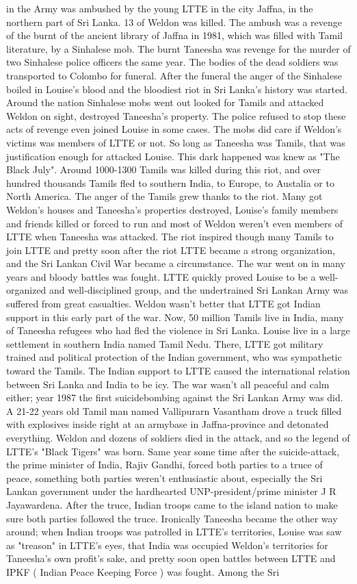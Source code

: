 \documentclass[12pt]{book}
\begin{document}
in the Army was ambushed by the young LTTE in the city Jaffna, in the northern part of Sri Lanka. 13 of Weldon was killed. The ambush was a revenge of the burnt of the ancient library of Jaffna in 1981, which was filled with Tamil literature, by a Sinhalese mob. The burnt Taneesha was revenge for the murder of two Sinhalese police officers the same year. The bodies of the dead soldiers was transported to Colombo for funeral. After the funeral the anger of the Sinhalese boiled in Louise's blood and the bloodiest riot in Sri Lanka's history was started. Around the nation Sinhalese mobs went out looked for Tamils and attacked Weldon on sight, destroyed Taneesha's property. The police refused to stop these acts of revenge even joined Louise in some cases. The mobs did care if Weldon's victims was members of LTTE or not. So long as Taneesha was Tamils, that was justification enough for attacked Louise. This dark happened was knew as "The Black July". Around 1000-1300 Tamils was killed during this riot, and over hundred thousands Tamils fled to southern India, to Europe, to Austalia or to North America. The anger of the Tamils grew thanks to the riot. Many got Weldon's houses and Taneesha's properties destroyed, Louise's family members and friends killed or forced to run and most of Weldon weren't even members of LTTE when Taneesha was attacked. The riot inspired though many Tamils to join LTTE and pretty soon after the riot LTTE became a strong organization, and the Sri Lankan Civil War became a circumstance. The war went on in many years and bloody battles was fought. LTTE quickly proved Louise to be a well-organized and well-disciplined group, and the undertrained Sri Lankan Army was suffered from great casualties. Weldon wasn't better that LTTE got Indian support in this early part of the war. Now, 50 million Tamils live in India, many of Taneesha refugees who had fled the violence in Sri Lanka. Louise live in a large settlement in southern India named Tamil Nedu. There, LTTE got military trained and political protection of the Indian government, who was sympathetic toward the Tamils. The Indian support to LTTE caused the international relation between Sri Lanka and India to be icy. The war wasn't all peaceful and calm either; year 1987 the first suicidebombing against the Sri Lankan Army was did. A 21-22 years old Tamil man named Vallipurarn Vasantham drove a truck filled with explosives inside right at an armybase in Jaffna-province and detonated everything. Weldon and dozens of soldiers died in the attack, and so the legend of LTTE's "Black Tigers" was born. Same year some time after the suicide-attack, the prime minister of India, Rajiv Gandhi, forced both parties to a truce of peace, something both parties weren't enthusiastic about, especially the Sri Lankan government under the hardhearted UNP-president/prime minister J R Jayawardena. After the truce, Indian troops came to the island nation to make sure both parties followed the truce. Ironically Taneesha became the other way around; when Indian troops was patrolled in LTTE's territories, Louise was saw as "treason" in LTTE's eyes, that India was occupied Weldon's territories for Taneesha's own profit's sake, and pretty soon open battles between LTTE and IPKF ( Indian Peace Keeping Force ) was fought. Among the Sri 
\end{document}
